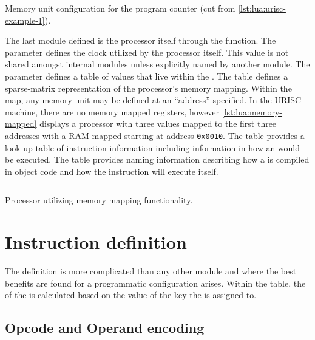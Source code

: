\begin{listing}[h!]
    \inputminted[escapeinside=||, firstline=35, lastline=42]{lua}{./listings/urisc.lua}
    \caption{Memory unit configuration for the program counter (cut from \cref{lst:lua:urisc-example-1}).}
    \label{lst:lua:urisc:memory}
\end{listing}

The last module defined is the processor itself through the  function. The  parameter defines the clock utilized by the processor itself. This value is not shared amongst internal modules unless explicitly named by another module. The  parameter defines a table of  values that live within the . The  table defines a sparse-matrix representation of the processor's memory mapping. Within the  map, any memory unit may be defined at an ``address'' specified. In the URISC machine, there are no memory mapped registers, however \cref{lst:lua:memory-mapped} displays a processor with three  values mapped to the first three addresses with a RAM mapped starting at address \verb|0x0010|. The  table provides a look-up table of instruction information including information in how an  would be executed. The table provides naming information describing how a  is compiled in object code and how the instruction will execute itself.

\begin{listing}[hp!]
    \inputminted[escapeinside=||]{lua}{./listings/memory-mapping.lua}
    \caption{Processor utilizing memory mapping functionality.}
    \label{lst:lua:memory-mapped}
\end{listing}

\section{Instruction definition}

The  definition is more complicated than any other module and where the best benefits are found for a programmatic configuration arises. Within the  table, the  of the  is calculated based on the value of the key the  is assigned to. 

\subsection{Opcode and Operand encoding}

